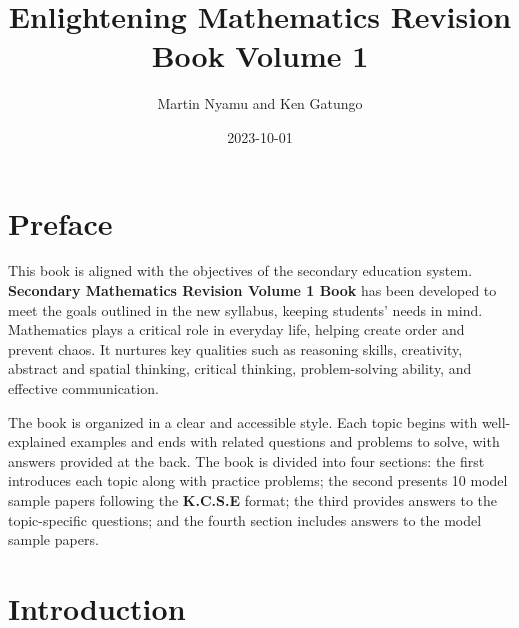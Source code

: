 \documentclass[
  a4paperpaper,
]{scrbook}
\title{Enlightening Mathematics Revision Book Volume 1}
\author{Martin Nyamu and Ken Gatungo}
\date{2023-10-01}
\renewcommand*\contentsname{Table of contents}
\newcommand\contentsname{Table of contents}
\begin{document}
\frontmatter
\maketitle
\ifdefined\Shaded\renewenvironment{Shaded}{\begin{tcolorbox}[interior hidden, breakable, frame hidden, borderline west={3pt}{0pt}{shadecolor}, boxrule=0pt, enhanced, sharp corners]}{\end{tcolorbox}}\fi

\renewcommand*\contentsname{Table of contents}
{
\hypersetup{linkcolor=}
\setcounter{tocdepth}{2}
\tableofcontents
}
\mainmatter
{}

\hypertarget{preface}{%
\chapter*{Preface}\label{preface}}


This book is aligned with the objectives of the secondary education
system. \textbf{Secondary Mathematics Revision Volume 1 Book} has been
developed to meet the goals outlined in the new syllabus, keeping
students' needs in mind. Mathematics plays a critical role in everyday
life, helping create order and prevent chaos. It nurtures key qualities
such as reasoning skills, creativity, abstract and spatial thinking,
critical thinking, problem-solving ability, and effective communication.

The book is organized in a clear and accessible style. Each topic begins
with well-explained examples and ends with related questions and
problems to solve, with answers provided at the back. The book is
divided into four sections: the first introduces each topic along with
practice problems; the second presents 10 model sample papers following
the \textbf{K.C.S.E} format; the third provides answers to the
topic-specific questions; and the fourth section includes answers to the
model sample papers.


\hypertarget{introduction}{%
\chapter*{Introduction}\label{introduction}}

\end{document}
